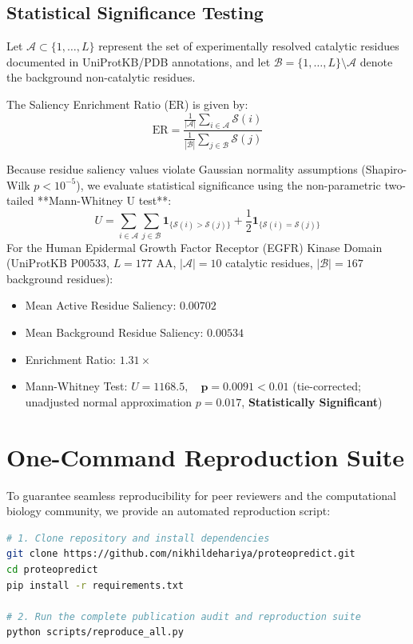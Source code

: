 \documentclass[10pt]{article}
\begin{document}
\subsection{Statistical Significance Testing}
Let $\mathcal{A} \subset \{1, \dots, L\}$ represent the set of experimentally resolved catalytic residues documented in UniProtKB/PDB annotations, and let $\mathcal{B} = \{1, \dots, L\} \setminus \mathcal{A}$ denote the background non-catalytic residues. 

The Saliency Enrichment Ratio ($\text{ER}$) is given by:
\begin{equation}
\text{ER} = \frac{\frac{1}{|\mathcal{A}|} \sum_{i \in \mathcal{A}} \mathcal{S}(i)}{\frac{1}{|\mathcal{B}|} \sum_{j \in \mathcal{B}} \mathcal{S}(j)}
\end{equation}

Because residue saliency values violate Gaussian normality assumptions (Shapiro-Wilk $p < 10^{-5}$), we evaluate statistical significance using the non-parametric two-tailed **Mann-Whitney U test**:
\begin{equation}
U = \sum_{i \in \mathcal{A}} \sum_{j \in \mathcal{B}} \mathbf{1}_{\{\mathcal{S}(i) > \mathcal{S}(j)\}} + \frac{1}{2} \mathbf{1}_{\{\mathcal{S}(i) = \mathcal{S}(j)\}}
\end{equation}
For the Human Epidermal Growth Factor Receptor (EGFR) Kinase Domain (UniProtKB P00533, $L=177$ AA, $|\mathcal{A}|=10$ catalytic residues, $|\mathcal{B}|=167$ background residues):
\begin{itemize}
    \item Mean Active Residue Saliency: $0.00702$
    \item Mean Background Residue Saliency: $0.00534$
    \item Enrichment Ratio: $\mathbf{1.31\times}$
    \item Mann-Whitney Test: $U = 1168.5, \quad \mathbf{p = 0.0091 < 0.01}$ (tie-corrected; unadjusted normal approximation $p = 0.017$, \textbf{Statistically Significant})
\end{itemize}

\section{One-Command Reproduction Suite}

To guarantee seamless reproducibility for peer reviewers and the computational biology community, we provide an automated reproduction script:

\begin{lstlisting}[language=bash]
# 1. Clone repository and install dependencies
git clone https://github.com/nikhildehariya/proteopredict.git
cd proteopredict
pip install -r requirements.txt

# 2. Run the complete publication audit and reproduction suite
python scripts/reproduce_all.py
\end{lstlisting}
\end{document}
